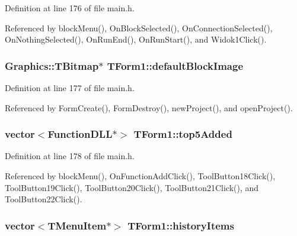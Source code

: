 Definition at line 176 of file main.h.

Referenced by blockMenu(), OnBlockSelected(), OnConnectionSelected(), OnNothingSelected(), OnRunEnd(), OnRunStart(), and Widok1Click().\hypertarget{classTForm1_0c8e62274e3d29dc58ed0a6b05637771}{
\subsubsection[defaultBlockImage]{\setlength{\rightskip}{0pt plus 5cm}Graphics::TBitmap$\ast$ {\bf TForm1::defaultBlockImage}}}
\label{classTForm1_0c8e62274e3d29dc58ed0a6b05637771}




Definition at line 177 of file main.h.

Referenced by FormCreate(), FormDestroy(), newProject(), and openProject().\hypertarget{classTForm1_dc19047fa18712f475ad00bd336c91d8}{
\subsubsection[top5Added]{\setlength{\rightskip}{0pt plus 5cm}vector$<${\bf FunctionDLL}$\ast$$>$ {\bf TForm1::top5Added}}}
\label{classTForm1_dc19047fa18712f475ad00bd336c91d8}




Definition at line 178 of file main.h.

Referenced by blockMenu(), OnFunctionAddClick(), ToolButton18Click(), ToolButton19Click(), ToolButton20Click(), ToolButton21Click(), and ToolButton22Click().\hypertarget{classTForm1_a61aac6247f2779f856ceeb1133e6ff3}{
\subsubsection[historyItems]{\setlength{\rightskip}{0pt plus 5cm}vector$<$TMenuItem$\ast$$>$ {\bf TForm1::historyItems}}}
\label{classTForm1_a61aac6247f2779f856ceeb1133e6ff3}




